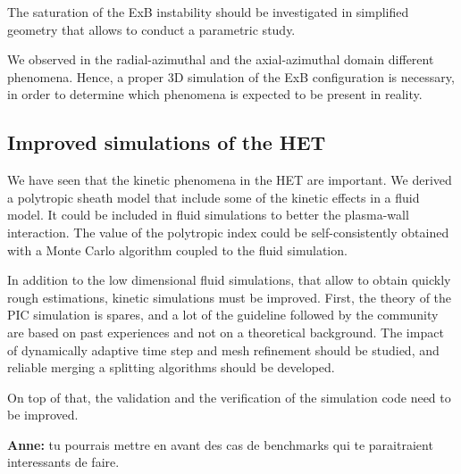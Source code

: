 The saturation of the ExB instability should be investigated in simplified geometry that allows to conduct a parametric study.

We observed in the radial-azimuthal and the axial-azimuthal domain different phenomena.
Hence, a proper 3D simulation of the ExB configuration is necessary, in order to determine which phenomena is expected to be present in reality.

\subsection{Improved simulations of the HET}
We have seen that the kinetic phenomena in the HET are important.
We derived a polytropic sheath model that include some of the kinetic effects in a fluid model.
It could be included in fluid simulations to better the plasma-wall interaction.
The value of the polytropic index could be self-consistently obtained with a Monte Carlo algorithm coupled to the fluid simulation.

In addition to the low dimensional fluid simulations, that allow to obtain quickly rough estimations, kinetic simulations must be improved.
First, the theory of the PIC simulation is spares, and a lot of the guideline followed by the community are based on past experiences and not on a theoretical background.
The impact of dynamically adaptive time step and mesh refinement should be studied, and reliable merging a splitting algorithms should be developed.

On top of that, the validation and the verification of the simulation code need to be improved.

{\bf Anne: } tu pourrais mettre en avant des cas de benchmarks qui te paraitraient interessants de faire.

